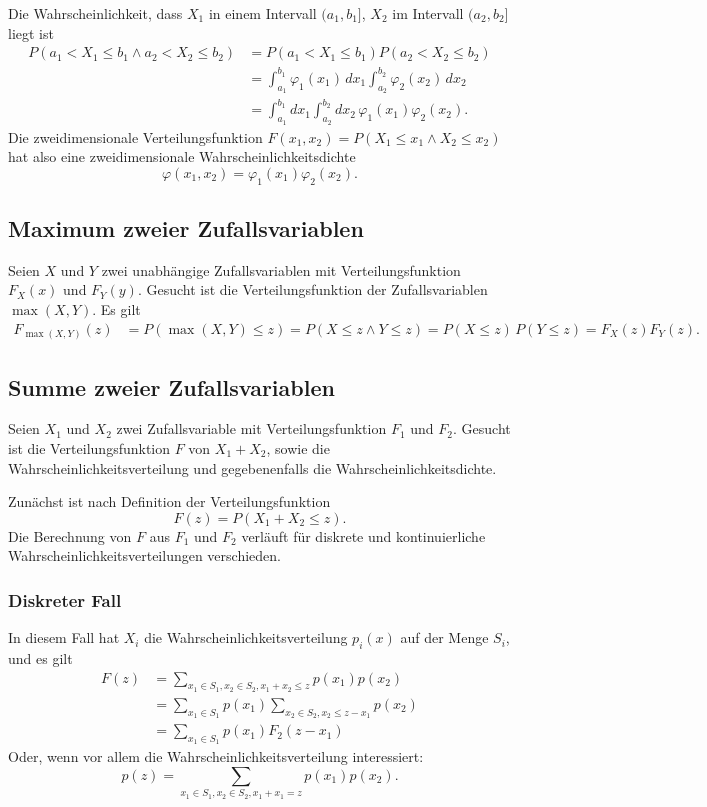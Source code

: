 Die Wahrscheinlichkeit, dass $X_1$ in einem Intervall $(a_1,b_1]$,
$X_2$ im Intervall $(a_2,b_2]$ liegt ist 
\begin{align*}
P(a_1<X_1\le b_1\wedge a_2<X_2\le b_2)
&= P(a_1<X_1\le b_1) P(a_2<X_2\le b_2)\\
&=\int_{a_1}^{b_1}\varphi_1(x_1)\,dx_1
\int_{a_2}^{b_2}\varphi_2(x_2)\,dx_2\\
&=\int_{a_1}^{b_1}dx_1
\int_{a_2}^{b_2}dx_2\,
\varphi_1(x_1) \varphi_2(x_2).
\end{align*}
Die zweidimensionale
Verteilungsfunktion $F(x_1,x_2)=P(X_1\le x_1\wedge X_2\le x_2)$ hat
also eine zweidimensionale Wahrscheinlichkeitsdichte
\[
\varphi(x_1,x_2)=\varphi_1(x_1)\varphi_2(x_2).
\]

\subsection{Maximum zweier Zufallsvariablen}
Seien $X$ und $Y$ zwei unabhängige Zufallsvariablen mit Verteilungsfunktion
$F_X(x)$ und $F_Y(y)$.
Gesucht ist die Verteilungsfunktion der Zufallsvariablen
$\max(X,Y)$.
Es gilt
\begin{align*}
F_{\max(X,Y)}(z)
&=
P(\max(X,Y)\le z)
=
P(X\le z\wedge Y\le z)
=
P(X\le z)\,P(Y\le z)
=
F_X(z)F_Y(z).
\end{align*}

\subsection{Summe zweier Zufallsvariablen}
Seien $X_1$ und $X_2$ zwei Zufallsvariable mit Verteilungsfunktion $F_1$ und
$F_2$.
Gesucht ist die Verteilungsfunktion $F$ von $X_1+X_2$, sowie die
Wahrscheinlichkeitsverteilung und gegebenenfalls die Wahrscheinlichkeitsdichte.

Zunächst ist nach Definition der Verteilungsfunktion
\[
F(z)=P(X_1+X_2\le z).
\]
Die Berechnung von $F$ aus $F_1$ und $F_2$ verläuft für diskrete und
kontinuierliche Wahrscheinlichkeitsverteilungen verschieden.
\subsubsection{Diskreter Fall}
In diesem Fall hat $X_i$ die Wahrscheinlichkeitsverteilung
$p_i(x)$ auf der Menge $S_i$, und es gilt
\begin{align*}
F(z)&=\sum_{x_1\in S_1, x_2\in S_2, x_1+x_2\le z}p(x_1)p(x_2)\\
&=\sum_{x_1\in S_1}p(x_1)\sum_{x_2\in S_2, x_2 \le z - x_1}p(x_2)\\
&=\sum_{x_1\in S_1}p(x_1) F_2(z-x_1)
\end{align*}
Oder, wenn vor allem die Wahrscheinlichkeitsverteilung interessiert:
\[
p(z)=\sum_{x_1\in S_1, x_2\in S_2, x_1+x_1=z}p(x_1)p(x_2).
\]
